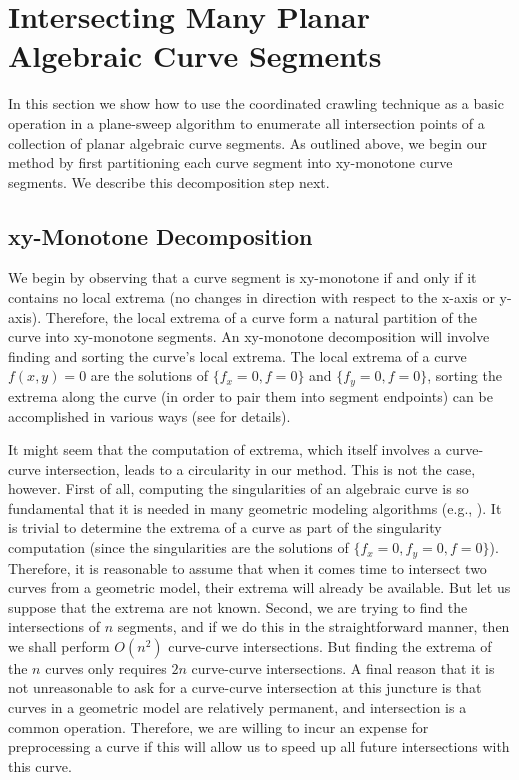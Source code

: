 \section{Intersecting Many Planar Algebraic Curve Segments}
\label{sec-intersect}

In this section we show how to use the coordinated crawling technique as
a basic operation in a plane-sweep algorithm to enumerate all
intersection points of a collection of planar algebraic curve segments.
As outlined above, we begin our method by first partitioning each curve
segment into xy-monotone curve segments.
We describe this decomposition step next.

\subsection{xy-Monotone Decomposition}
\label{sec-decomp}

We begin by observing that
a curve segment is xy-monotone if and only if it contains no local extrema
(no changes in direction with respect to the x-axis or y-axis).
Therefore, the local extrema of a curve form a natural partition
of the curve into xy-monotone segments.
An xy-monotone decomposition will involve finding
and sorting the curve's local extrema.
The local extrema of a curve $f(x,y)=0$ are the solutions of
$\{f_{x}=0,f=0\}$ and $\{f_{y}=0,f=0\}$,
sorting the extrema along the curve (in order to pair them 
into segment endpoints) can be accomplished in various 
ways (see \cite{johnstone87} for details).

It might seem that the computation of extrema, which itself involves a curve-curve
intersection, leads to a circularity in our method.
This is not the case, however.
First of all, computing the singularities of an algebraic curve is 
so fundamental that
it is 
needed in many geometric modeling algorithms (e.g., \cite{abba,johnstone87}).
It is trivial to determine the extrema of a curve as part of the singularity 
computation (since the singularities are the solutions of $\{f_{x}=0,f_{y}=0,f=0\}$).
Therefore, it is reasonable to assume that when it comes time to intersect two
curves from a geometric model, their extrema will already be available.
But let us suppose that the extrema are not known.
Second, we are trying to find the intersections of $n$ segments, and 
if we do this in the straightforward manner, then we shall perform $O(n^{2})$
curve-curve intersections.
But finding the extrema of the $n$ curves only requires
$2n$ curve-curve intersections.
A final reason that it is not unreasonable to ask for a curve-curve
intersection at this juncture is that curves in a geometric model are relatively
permanent, and intersection is a common operation.
Therefore, we are willing to incur an expense for preprocessing a curve if this
will allow us to speed up all future intersections with this curve.

